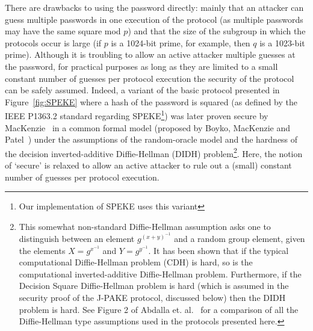 There are drawbacks to using the password directly: mainly that an attacker can guess multiple passwords in one execution of the 
protocol (as multiple passwords may have the same square mod $p$) and that the size of the subgroup in which the 
protocols occur is large (if $p$ is a 1024-bit prime, for example, then $q$ is a 1023-bit prime).  Although it is troubling to allow
an active attacker multiple guesses at the password, for practical purposes as long as they are limited to a small constant number of 
guesses per protocol execution the security of the protocol can be safely assumed.  Indeed, a variant of the basic protocol presented in 
Figure~\ref{fig:SPEKE} where a hash of the password is squared (as defined by the IEEE P1363.2 standard regarding SPEKE\footnote{Our implementation of SPEKE uses this variant}) was later proven secure
by MacKenzie~\cite{Mac01} in a common formal model (proposed by Boyko, MacKenzie and Patel~\cite{BoMaPa00}) under the assumptions of the
random-oracle model and the hardness of the decision inverted-additive Diffie-Hellman (DIDH) problem\footnote{This somewhat non-standard Diffie-Hellman assumption asks one to distinguish between an element $g^{(x+y)^{-1}}$ and a random group element, given the elements $X = g^{x^{-1}}$ and $Y = g^{y^{-1}}$.  It has been shown that if the typical computational Diffie-Hellman problem (CDH) is hard, so is the computational inverted-additive Diffie-Hellman problem.  Furthermore, if the Decision Square Diffie-Hellman problem is hard (which is assumed in the security proof of the J-PAKE protocol, discussed below) then the DIDH problem is hard. See Figure 2 of Abdalla et. al.~\cite{AbdBenMac15} for a comparison of all the Diffie-Hellman type assumptions used in the protocols presented here.}.  Here, the notion of `secure' is relaxed to allow an active attacker to rule out a (small) constant number of guesses per protocol execution.


